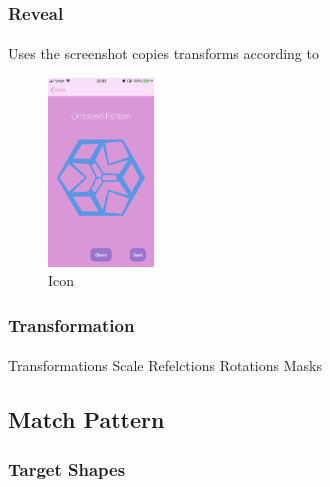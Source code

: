 \documentclass[11pt]{article}
\begin{document}
    \subsubsection{Reveal}
    
            \paragraph{}
Uses the screenshot
copies 
transforms according to


\begin{figure}
                        \centering
                        \includegraphics[width=0.25\textwidth]{KiriZen/createUnfoldedPattern.png}
                        \caption{Icon}
                        \label{fig:kiriZen-createUnfoldedPattern}
                    \end{figure}

        \subsubsection{Transformation}
        
                \paragraph{}
                
                Transformations
                Scale
                Refelctions
                Rotations
                Masks



    \subsection{Match Pattern}

        \subsubsection{Target Shapes}
\end{document}

